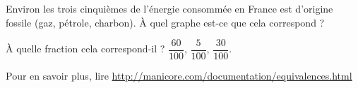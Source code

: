 
\begin{exercice}\label{exosmath-0818}

    Environ les trois cinquièmes de l'énergie consommée en France est d'origine fossile (gaz, pétrole, charbon). À quel graphe est-ce que cela correspond ?

\begin{center}
   
   
   
\end{center}

À quelle fraction cela correspond-il ? \( \dfrac{ 60 }{ 100 }\), \( \dfrac{ 5 }{ 100 }\), \( \dfrac{ 30 }{ 100 }\).

{\small Pour en savoir plus, lire \url{http://manicore.com/documentation/equivalences.html}}

\end{exercice}
